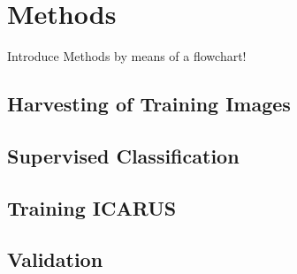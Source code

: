 \section{Methods}
	Introduce Methods by means of a flowchart!
		\subsection{Harvesting of Training Images}
		\subsection{Supervised Classification}
		\subsection{Training ICARUS}
		\subsection{Validation}
			\cite{hilbert2016}